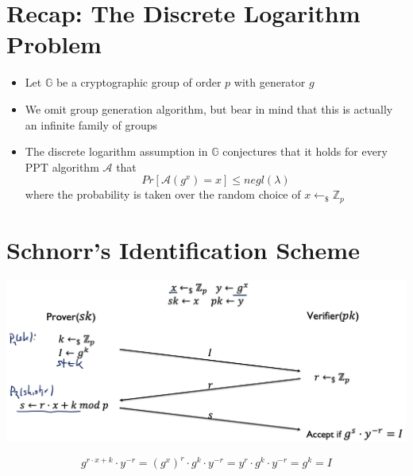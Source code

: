 \section{Recap: The Discrete Logarithm Problem}
    \begin{itemize}
        \item Let $\mathbb{G}$ be a cryptographic group of order $p$ with generator $g$
        \item We omit group generation algorithm, but bear in mind that this is actually an infinite family of groups
        \item The discrete logarithm assumption in $\mathbb{G}$ conjectures that it holds for every PPT algorithm $\mathcal{A}$ that
        $$Pr[\mathcal{A}(g^x)=x] \leq negl(\lambda)$$
        where the probability is taken over the random choice of $x \leftarrow_{\$} \mathbb{Z}_p$
    \end{itemize}

\section{Schnorr's Identification Scheme}
    \begin{center}
	    \includegraphics[width=140mm]{Graphics/Digital Signatures/is4.png}
    \end{center}
    $$g^{r \cdot x + k} \cdot y^{-r} = (g^x)^r \cdot g^k \cdot y^{-r} = y^r \cdot g^k \cdot y^{-r} = g^k = I$$

\newpage
